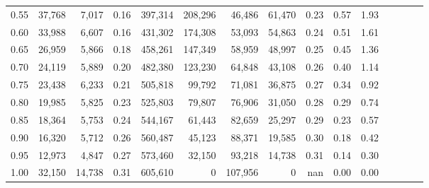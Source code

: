 \begin{tabular}{rrrcrrrrrrrrrrr}
0.55 &  37,768 &   7,017 &                                       0.16 &  397,314 &  208,296 &   46,486 &   61,470 &  0.23 &  0.57 &                         1.93 \\
0.60 &  33,988 &   6,607 &                                       0.16 &  431,302 &  174,308 &   53,093 &   54,863 &  0.24 &  0.51 &                         1.61 \\
0.65 &  26,959 &   5,866 &                                       0.18 &  458,261 &  147,349 &   58,959 &   48,997 &  0.25 &  0.45 &                         1.36 \\
0.70 &  24,119 &   5,889 &                                       0.20 &  482,380 &  123,230 &   64,848 &   43,108 &  0.26 &  0.40 &                         1.14 \\
0.75 &  23,438 &   6,233 &                                       0.21 &  505,818 &   99,792 &   71,081 &   36,875 &  0.27 &  0.34 &                         0.92 \\
0.80 &  19,985 &   5,825 &                                       0.23 &  525,803 &   79,807 &   76,906 &   31,050 &  0.28 &  0.29 &                         0.74 \\
0.85 &  18,364 &   5,753 &                                       0.24 &  544,167 &   61,443 &   82,659 &   25,297 &  0.29 &  0.23 &                         0.57 \\
0.90 &  16,320 &   5,712 &                                       0.26 &  560,487 &   45,123 &   88,371 &   19,585 &  0.30 &  0.18 &                         0.42 \\
0.95 &  12,973 &   4,847 &                                       0.27 &  573,460 &   32,150 &   93,218 &   14,738 &  0.31 &  0.14 &                         0.30 \\
1.00 &  32,150 &  14,738 &                                       0.31 &  605,610 &        0 &  107,956 &        0 &   nan &  0.00 &                         0.00 \\
\bottomrule
\end{tabular}
